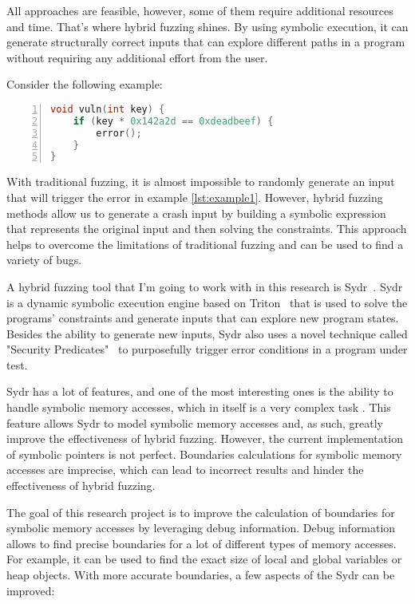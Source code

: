 \documentclass[conference]{IEEEtran}
\begin{document}
All approaches are feasible, however, some of them require additional resources and time. That's where hybrid fuzzing shines. By using symbolic execution, it can generate structurally correct inputs that can explore different paths in a program without requiring any additional effort from the user.

Consider the following example:

\begin{lstlisting}[caption={Example solvable by hybrid fuzzing},label={lst:example1},language=C, basicstyle=\small\ttfamily, numbers=left, xleftmargin=2em, breaklines=true, captionpos=b]
void vuln(int key) {
    if (key * 0x142a2d == 0xdeadbeef) {
        error();
    }
}
\end{lstlisting}


With traditional fuzzing, it is almost impossible to randomly generate an input that will trigger the error in example \ref{lst:example1}. However, hybrid fuzzing methods allow us to generate a crash input by building a symbolic expression that represents the original input and then solving the constraints. This approach helps to overcome the limitations of traditional fuzzing and can be used to find a variety of bugs.

A hybrid fuzzing tool that I'm going to work with in this research is Sydr~\cite{sydr-cutting-edge-dynamic-symbolic-execution}. Sydr is a dynamic symbolic execution engine based on Triton~\cite{saudel15} that is used to solve the programs' constraints and generate inputs that can explore new program states. Besides the ability to generate new inputs, Sydr also uses a novel technique called {"Security Predicates"}~\cite{symbolic-security-predicates} to purposefully trigger error conditions in a program under test.

Sydr has a lot of features, and one of the most interesting ones is the ability to handle symbolic memory accesses, which in itself is a very complex task \cite{symbolic-pointers-reasoning}. This feature allows Sydr to model symbolic memory accesses and, as such, greatly improve the effectiveness of hybrid fuzzing. However, the current implementation of symbolic pointers is not perfect. Boundaries calculations for symbolic memory accesses are imprecise, which can lead to incorrect results and hinder the effectiveness of hybrid fuzzing.

The goal of this research project is to improve the calculation of boundaries for symbolic memory accesses by leveraging debug information. Debug information allows to find precise boundaries for a lot of different types of memory accesses. For example, it can be used to find the exact size of local and global variables or heap objects. With more accurate boundaries, a few aspects of the Sydr can be improved:
\end{document}
